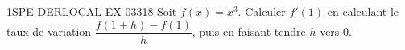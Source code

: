 \begin{exercice}{1SPE-DERLOCAL-EX-033}{1}{8}
Soit $f(x)=x^3$. Calculer $f'(1)$ en calculant le taux de variation $\dfrac{f(1+h)-f(1)}{h}$, puis en faisant tendre $h$ vers $0$.
\end{exercice}
